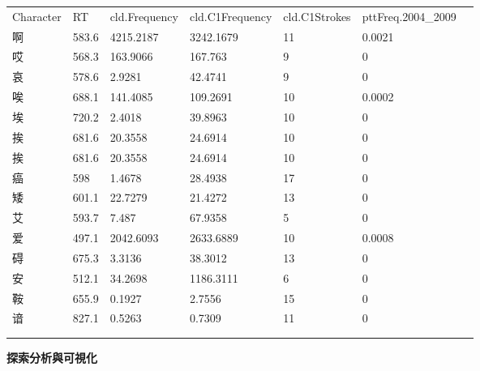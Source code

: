 \tabletail{}
\tablelasttail{}
\begin{tabularx}{\textwidth}{XXXXXXXXXXX}
\lsptoprule
Character & \multicolumn{2}{X}{RT} & \multicolumn{2}{X}{cld.Frequency} & cld.C1Frequency & \multicolumn{2}{X}{cld.C1Strokes} & \multicolumn{2}{X}{pttFreq.2004\_2009} & \\
\hhline{----------~}
啊 & \multicolumn{2}{X}{583.6} & \multicolumn{2}{X}{4215.2187} & 3242.1679 & \multicolumn{2}{X}{11} & \multicolumn{2}{X}{0.0021} & \\
{}哎 & \multicolumn{2}{X}{568.3} & \multicolumn{2}{X}{163.9066} & 167.763 & \multicolumn{2}{X}{9} & \multicolumn{2}{X}{0} & \\
{}哀 & \multicolumn{2}{X}{578.6} & \multicolumn{2}{X}{2.9281} & 42.4741 & \multicolumn{2}{X}{9} & \multicolumn{2}{X}{0} & \\
{}唉 & \multicolumn{2}{X}{688.1} & \multicolumn{2}{X}{141.4085} & 109.2691 & \multicolumn{2}{X}{10} & \multicolumn{2}{X}{0.0002} & \\
{}埃 & \multicolumn{2}{X}{720.2} & \multicolumn{2}{X}{2.4018} & 39.8963 & \multicolumn{2}{X}{10} & \multicolumn{2}{X}{0} & \\
{}挨 & \multicolumn{2}{X}{681.6} & \multicolumn{2}{X}{20.3558} & 24.6914 & \multicolumn{2}{X}{10} & \multicolumn{2}{X}{0} & \\
{}挨 & \multicolumn{2}{X}{681.6} & \multicolumn{2}{X}{20.3558} & 24.6914 & \multicolumn{2}{X}{10} & \multicolumn{2}{X}{0} & \\
{}癌 & \multicolumn{2}{X}{598} & \multicolumn{2}{X}{1.4678} & 28.4938 & \multicolumn{2}{X}{17} & \multicolumn{2}{X}{0} & \\
{}矮 & \multicolumn{2}{X}{601.1} & \multicolumn{2}{X}{22.7279} & 21.4272 & \multicolumn{2}{X}{13} & \multicolumn{2}{X}{0} & \\
{}艾 & \multicolumn{2}{X}{593.7} & \multicolumn{2}{X}{7.487} & 67.9358 & \multicolumn{2}{X}{5} & \multicolumn{2}{X}{0} & \\
{}爱 & \multicolumn{2}{X}{497.1} & \multicolumn{2}{X}{2042.6093} & 2633.6889 & \multicolumn{2}{X}{10} & \multicolumn{2}{X}{0.0008} & \\
{}碍 & \multicolumn{2}{X}{675.3} & \multicolumn{2}{X}{3.3136} & 38.3012 & \multicolumn{2}{X}{13} & \multicolumn{2}{X}{0} & \\
{}安 & \multicolumn{2}{X}{512.1} & \multicolumn{2}{X}{34.2698} & 1186.3111 & \multicolumn{2}{X}{6} & \multicolumn{2}{X}{0} & \\
{}鞍 & \multicolumn{2}{X}{655.9} & \multicolumn{2}{X}{0.1927} & 2.7556 & \multicolumn{2}{X}{15} & \multicolumn{2}{X}{0} & \\
{}谙 & \multicolumn{2}{X}{827.1} & \multicolumn{2}{X}{0.5263} & 0.7309 & \multicolumn{2}{X}{11} & \multicolumn{2}{X}{0} & \\
\multicolumn{2}{X}{} & \multicolumn{2}{X}{} & \multicolumn{3}{X}{} & \multicolumn{2}{X}{} & \multicolumn{2}{X}{}\\
\lspbottomrule
\end{tabularx}
\textbf{探索分析與可視化}

